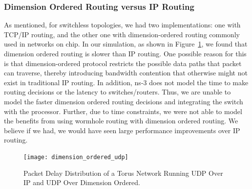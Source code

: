 

\subsubsection{Dimension Ordered Routing versus IP Routing}
As mentioned, for switchless topologies, we had two implementations: one with TCP/IP routing, and the other one with dimension-ordered routing commonly used in networks on chip. In our simulation, as shown in Figure~\ref{fig:dim_ordered}, we found that dimension ordered routing is slower than IP routing. One possible reason for this is that dimension-ordered protocol restricts the possible data paths that packet can traverse, thereby introducing bandwidth contention that otherwise might not exist in traditional IP routing.  In addition, ns-3 does not model the time to make routing decisions or the latency to switches/routers.  Thus, we are unable to model the faster dimension ordered routing decisions and integrating the switch with the processor.  Further, due to time constraints, we were not able to model the benefits from using wormhole routing with dimension ordered routing.  We believe if we had, we would have seen large performance improvements over IP routing.

\captionsetup[subfloat]{captionskip=-0.003in}
\begin{figure}
    \centering
    \texttt{[image: dimension\_ordered\_udp]}
    \vspace{-0.1in}
    \caption{Packet Delay Distribution of a Torus Network Running UDP Over IP and UDP Over Dimension Ordered.}
    \label{fig:dim_ordered}
    \vspace{-0.1in}
\end{figure}

